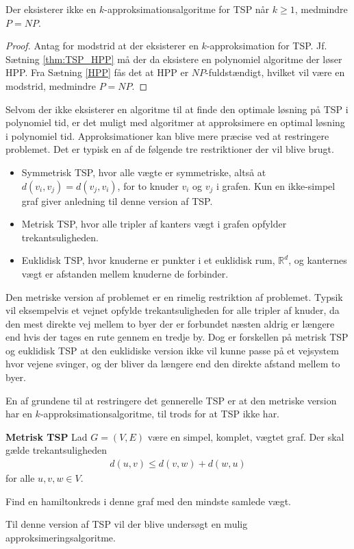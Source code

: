\begin{tcolorbox}
	\begin{cor}
		Der eksisterer ikke en $k$-approksimationsalgoritme for TSP når $k \geq 1$, medmindre $P = NP$.
	\end{cor}
\end{tcolorbox}
\begin{proof}
	Antag for modstrid at der eksisterer en $k$-approksimation for TSP.
	Jf. Sætning \ref{thm:TSP_HPP} må der da eksistere en polynomiel algoritme der løser HPP. 
	Fra Sætning \ref{HPP} fås det at HPP er $NP$-fuldstændigt, hvilket vil være en modstrid, medmindre $P=NP$.
\end{proof}

Selvom der ikke eksisterer en algoritme til at finde den optimale løsning på TSP i polynomiel tid, er det muligt med algoritmer at approksimere en optimal løsning i polynomiel tid. Approksimationer kan blive mere præcise ved at restringere problemet.
Det er typisk en af de følgende tre restriktioner der vil blive brugt. 
\begin{itemize}[noitemsep]
	\item Symmetrisk TSP, hvor alle vægte er symmetriske, altså at $d(v_i, v_j) = d(v_j, v_i)$, for to knuder $v_i$ og $v_j$ i grafen. Kun en ikke-simpel graf giver anledning til denne version af TSP.
	\item Metrisk TSP, hvor alle tripler af kanters vægt i grafen opfylder trekantsuligheden.
	\item Euklidisk TSP, hvor knuderne er punkter i et euklidisk rum, ${\mathbb{R}}^d$, og kanternes vægt er afstanden mellem knuderne de forbinder.
\end{itemize}

Den metriske version af problemet er en rimelig restriktion af problemet.
Typsik vil eksempelvis et vejnet opfylde trekantsuligheden for alle tripler af knuder, da den mest direkte vej mellem to byer der er forbundet næsten aldrig er længere end hvis der tages en rute gennem en tredje by.
Dog er forskellen på metrisk TSP og euklidisk TSP at den euklidiske version ikke vil kunne passe på et vejsystem hvor vejene svinger, og der bliver da længere end den direkte afstand mellem to byer.

En af grundene til at restringere det gennerelle TSP er at den metriske version har en $k$-approksimationsalgoritme, til trods for at TSP ikke har.

\begin{tcolorbox}
	\textbf{Metrisk TSP} \quad Lad $G=(V,E)$ være en simpel, komplet, vægtet graf. Der skal gælde trekantsuligheden
	\begin{align*}
		d(u,v) \leq d(v,w) + d(w,u)
	\end{align*}
	for alle $u,v,w \in V$.

	Find en hamiltonkreds i denne graf med den mindste samlede vægt.
\end{tcolorbox}

Til denne version af TSP vil der blive undersøgt en mulig approksimeringsalgoritme.
